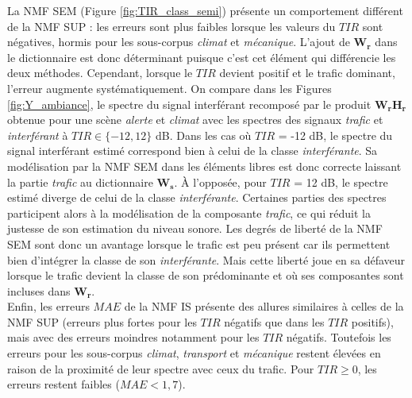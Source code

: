 La NMF SEM (Figure \ref{fig:TIR_class_semi}) présente un comportement différent de la NMF SUP : les erreurs sont plus faibles lorsque les valeurs du $TIR$ sont négatives, hormis pour les sous-corpus \textit{climat}  et \textit{mécanique}. L'ajout de $\mathbf{W_r}$ dans le dictionnaire est donc déterminant puisque c'est cet élément qui différencie les deux méthodes. Cependant, lorsque le $TIR$ devient positif et le trafic dominant, l'erreur augmente systématiquement.
On compare dans les Figures \ref{fig:Y_ambiance}, le spectre du signal interférant recomposé par le produit $\mathbf{W_rH_r}$ obtenue pour une scène \textit{alerte} et \textit{climat} avec les spectres des signaux \textit{trafic} et \textit{interférant} à $TIR \in \lbrace -12, 12 \rbrace$ dB. Dans les cas où $TIR$ = -12 dB, le spectre du signal interférant estimé correspond bien à celui de la classe \textit{interférante}. Sa modélisation par la NMF SEM dans les éléments libres est donc correcte laissant la partie \textit{trafic} au dictionnaire $\mathbf{W_s}$. À l'opposée, pour $TIR$ = 12 dB, le spectre estimé diverge de celui de la classe \textit{interférante}. Certaines parties des spectres participent alors à la modélisation de la composante \textit{trafic}, ce qui réduit la justesse de son estimation du niveau sonore. Les degrés de liberté de la NMF SEM sont donc un avantage lorsque le trafic est peu présent car ils permettent bien d'intégrer la classe de son \textit{interférante}. Mais cette liberté joue en sa défaveur lorsque le trafic devient la classe de son prédominante et où ses composantes sont incluses dans $\mathbf{W_r}$.\\

Enfin, les erreurs $MAE$ de la NMF IS présente des allures similaires à celles de la NMF SUP (erreurs plus fortes pour les $TIR$ négatifs que dans les $TIR$ positifs), mais avec des erreurs moindres notamment pour les $TIR$ négatifs. Toutefois les erreurs pour les sous-corpus \textit{climat}, \textit{transport} et \textit{mécanique} restent élevées en raison de la proximité de leur spectre avec ceux du trafic. Pour $TIR \geq 0$, les erreurs restent faibles ($MAE < 1,7$). 

